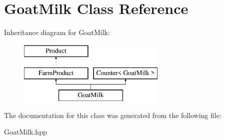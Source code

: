 \hypertarget{class_goat_milk}{}\section{Goat\+Milk Class Reference}
\label{class_goat_milk}
Inheritance diagram for Goat\+Milk\+:\begin{figure}[H]
\begin{center}
\leavevmode
\includegraphics[height=3.000000cm]{class_goat_milk}
\end{center}
\end{figure}


The documentation for this class was generated from the following file\+:\begin{DoxyCompactItemize}
\item 
Goat\+Milk.\+hpp\end{DoxyCompactItemize}
